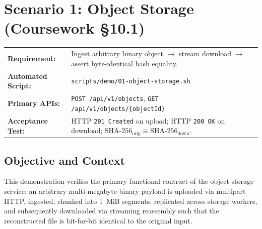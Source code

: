 \documentclass[12pt,a4paper]{report}
\begin{document}
\section{Scenario 1: Object Storage (Coursework \S10.1)}
\label{sec:demo-10-1}

\begin{infobox}
\begin{tabularx}{\textwidth}{lX}
\textbf{Requirement:}      & Ingest arbitrary binary object $\rightarrow$ stream download $\rightarrow$ assert byte-identical hash equality. \\
\textbf{Automated Script:} & \texttt{scripts/demo/01-object-storage.sh} \\
\textbf{Primary APIs:}     & \texttt{POST /api/v1/objects}, \texttt{GET /api/v1/objects/\{objectId\}} \\
\textbf{Acceptance Test:}  & HTTP \texttt{201 Created} on upload; HTTP \texttt{200 OK} on download; $\text{SHA-256}_{\text{orig}} \equiv \text{SHA-256}_{\text{down}}$. \\
\end{tabularx}
\end{infobox}

\subsection{Objective and Context}
This demonstration verifies the primary functional contract of the object storage service: an arbitrary multi-megabyte binary payload is uploaded via multipart HTTP, ingested, chunked into 1~MiB segments, replicated across storage workers, and subsequently downloaded via streaming reassembly such that the reconstructed file is bit-for-bit identical to the original input.
\end{document}
